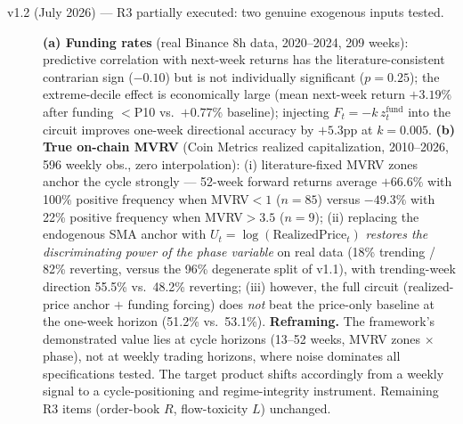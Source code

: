 \documentclass[11pt,a4paper]{article}
\begin{document}
\begin{description}
\item[v1.2 (July 2026) --- R3 partially executed: two genuine exogenous inputs tested.] \textbf{(a) Funding rates} (real Binance 8h data, 2020--2024, 209 weeks): predictive correlation with next-week returns has the literature-consistent contrarian sign ($-0.10$) but is not individually significant ($p=0.25$); the extreme-decile effect is economically large (mean next-week return $+3.19\%$ after funding $<$P10 vs.\ $+0.77\%$ baseline); injecting $F_t = -k\,z^{\text{fund}}_t$ into the circuit improves one-week directional accuracy by $+5.3$pp at $k=0.005$. \textbf{(b) True on-chain MVRV} (Coin Metrics realized capitalization, 2010--2026, 596 weekly obs., zero interpolation): (i) literature-fixed MVRV zones anchor the cycle strongly --- 52-week forward returns average $+66.6\%$ with 100\% positive frequency when MVRV$<1$ ($n=85$) versus $-49.3\%$ with 22\% positive frequency when MVRV$>3.5$ ($n=9$); (ii) replacing the endogenous SMA anchor with $U_t = \log(\text{RealizedPrice}_t)$ \emph{restores the discriminating power of the phase variable} on real data (18\% trending / 82\% reverting, versus the 96\% degenerate split of v1.1), with trending-week direction 55.5\% vs.\ 48.2\% reverting; (iii) however, the full circuit (realized-price anchor $+$ funding forcing) does \emph{not} beat the price-only baseline at the one-week horizon (51.2\% vs.\ 53.1\%). \textbf{Reframing.} The framework's demonstrated value lies at cycle horizons (13--52 weeks, MVRV zones $\times$ phase), not at weekly trading horizons, where noise dominates all specifications tested. The target product shifts accordingly from a weekly signal to a cycle-positioning and regime-integrity instrument. Remaining R3 items (order-book $R$, flow-toxicity $L$) unchanged.

\end{description}
\end{document}

